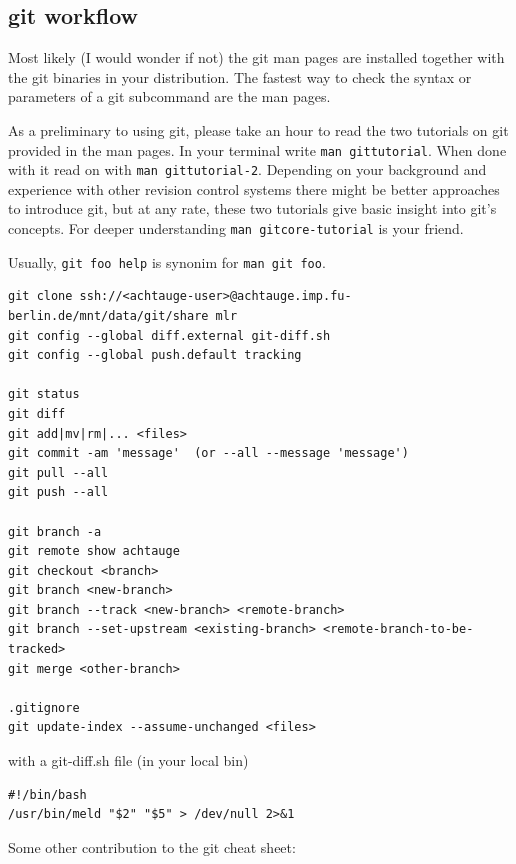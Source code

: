 \subsection{git workflow}\label{secGit}

Most likely (I would wonder if not) the git man pages are installed
together with the git binaries in your distribution. The fastest way to
check the syntax or parameters of a git subcommand are the man pages. 

As a preliminary to using git, please take an hour to read the two
tutorials on git provided in the man pages. In your terminal write
\verb+man gittutorial+. When done with it read on with %
%
\verb+man gittutorial-2+. Depending on your background and experience
with other revision control systems there might be better approaches to
introduce git, but at any rate, these two tutorials give basic
insight into git's concepts. For deeper understanding %
%
\verb+man gitcore-tutorial+ is your friend.

Usually, \verb+git foo help+ is synonim for \verb+man git foo+.

\begin{code}
\begin{verbatim}
git clone ssh://<achtauge-user>@achtauge.imp.fu-berlin.de/mnt/data/git/share mlr
git config --global diff.external git-diff.sh
git config --global push.default tracking

git status
git diff
git add|mv|rm|... <files>
git commit -am 'message'  (or --all --message 'message')
git pull --all
git push --all

git branch -a
git remote show achtauge
git checkout <branch>
git branch <new-branch>
git branch --track <new-branch> <remote-branch>
git branch --set-upstream <existing-branch> <remote-branch-to-be-tracked>
git merge <other-branch>

.gitignore
git update-index --assume-unchanged <files>
\end{verbatim}
\end{code}

with a git-diff.sh file (in your local bin)
\begin{code}
\begin{verbatim}
#!/bin/bash
/usr/bin/meld "$2" "$5" > /dev/null 2>&1
\end{verbatim}
\end{code}

Some other contribution to the git cheat sheet:


